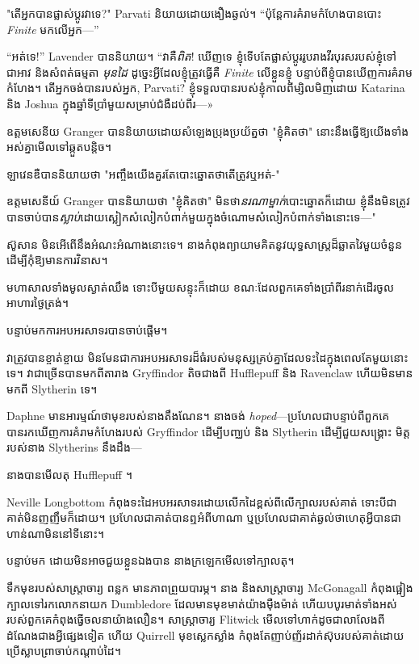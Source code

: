 {{{"តើអ្នកបានផ្លាស់ប្តូរវាទេ?" Parvati និយាយដោយងឿងឆ្ងល់។ “ប៉ុន្តែការគំរាមកំហែងបានបោះ \emph{Finite} មកលើអ្នក—”

“អត់ទេ!” Lavender បាននិយាយ។ “វាគឺ\emph{ពិត}! ឃើញទេ ខ្ញុំទើបតែផ្លាស់ប្តូររូបរាងវីរបុរសរបស់ខ្ញុំទៅជាអាវ និងសំពត់ធម្មតា \emph{មុនដៃ} ដូច្នេះអ្វីដែលខ្ញុំត្រូវធ្វើគឺ \emph{Finite} លើខ្លួនខ្ញុំ បន្ទាប់ពីខ្ញុំបានឃើញការគំរាមកំហែង។ តើ​អ្នក​ចង់​បាន​របស់​អ្នក, Parvati? ខ្ញុំទទួលបានរបស់ខ្ញុំកាលពីម្សិលមិញដោយ Katarina និង Joshua ក្នុងឆ្នាំទីប្រាំមួយសម្រាប់ជំងឺដប់ពីរ—»

ឧត្តមសេនីយ Granger បាននិយាយដោយសំឡេងប្រុងប្រយ័ត្នថា "ខ្ញុំគិតថា" នោះនឹងធ្វើឱ្យយើងទាំងអស់គ្នាមើលទៅឆ្កួតបន្តិច។

ឡាវេនឌឺបាននិយាយថា "អញ្ចឹងយើងគួរតែបោះឆ្នោតថាតើត្រូវឬអត់-"

ឧត្តមសេនីយ៍ Granger បាននិយាយថា "ខ្ញុំគិតថា" មិនថា\emph{នរណាម្នាក់}បោះឆ្នោតក៏ដោយ ខ្ញុំនឹងមិនត្រូវបានចាប់បាន\emph{ស្លាប់}ដោយស្លៀកសំលៀកបំពាក់មួយក្នុងចំណោមសំលៀកបំពាក់ទាំងនោះទេ—"

ស៊ូសាន មិនអើពើនឹងអំណះអំណាងនោះទេ។ នាងកំពុងព្យាយាមគិតនូវយុទ្ធសាស្ត្រដ៏ឆ្លាតវៃមួយចំនួន ដើម្បីកុំឱ្យមានការវិនាស។

\later

មហាសាលទាំងមូលស្ងាត់ឈឹង ទោះបីមួយសន្ទុះក៏ដោយ ខណៈដែលពួកគេទាំងប្រាំពីរនាក់ដើរចូលអាហារថ្ងៃត្រង់។

បន្ទាប់មកការអបអរសាទរបានចាប់ផ្តើម។

វាត្រូវបានខ្ចាត់ខ្ចាយ មិនមែនជាការអបអរសាទរដ៏ធំរបស់មនុស្សគ្រប់គ្នាដែលទះដៃក្នុងពេលតែមួយនោះទេ។ វាជាច្រើនបានមកពីតារាង Gryffindor តិចជាងពី Hufflepuff និង Ravenclaw ហើយមិនមានមកពី Slytherin ទេ។

Daphne មានអារម្មណ៍ថាមុខរបស់នាងតឹងណែន។ នាងចង់ \emph{hoped}—ប្រហែលជាបន្ទាប់ពីពួកគេបានរកឃើញការគំរាមកំហែងរបស់ Gryffindor ដើម្បីបញ្ឈប់ និង Slytherin ដើម្បីជួយសង្គ្រោះ មិត្តរបស់នាង Slytherins នឹងដឹង—

នាងបានមើលតុ Hufflepuff ។

Neville Longbottom កំពុង​ទះដៃ​អបអរសាទរ​ដោយ​លើកដៃ​ខ្ពស់​ពីលើ​ក្បាល​របស់គាត់ ទោះបីជា​គាត់​មិន​ញញឹម​ក៏ដោយ។ ប្រហែលជាគាត់បានឮអំពីហាណា ឬប្រហែលជាគាត់ឆ្ងល់ថាហេតុអ្វីបានជាហាន់ណាមិននៅទីនោះ។

បន្ទាប់មក ដោយមិនអាចជួយខ្លួនឯងបាន នាងក្រឡេកមើលទៅក្បាលតុ។

ទឹក​មុខ​របស់​សាស្ត្រាចារ្យ ពន្លក មាន​ភាព​ព្រួយ​បារម្ភ។ នាង និងសាស្រ្តាចារ្យ McGonagall កំពុងផ្អៀងក្បាលទៅរកលោកនាយក Dumbledore ដែលមានមុខមាត់យ៉ាងម៉ឺងម៉ាត់ ហើយបបូរមាត់ទាំងអស់របស់ពួកគេកំពុងធ្វើចលនាយ៉ាងលឿន។ សាស្រ្តាចារ្យ Flitwick មើលទៅហាក់ដូចជាលាលែងពីដំណែងជាងអ្វីផ្សេងទៀត ហើយ Quirrell មុខស្លេកស្លាំង កំពុងតែញាប់ញ័រដាក់ស៊ុបរបស់គាត់ដោយប្រើស្លាបព្រាចាប់កណ្តាប់ដៃ។

}}}
